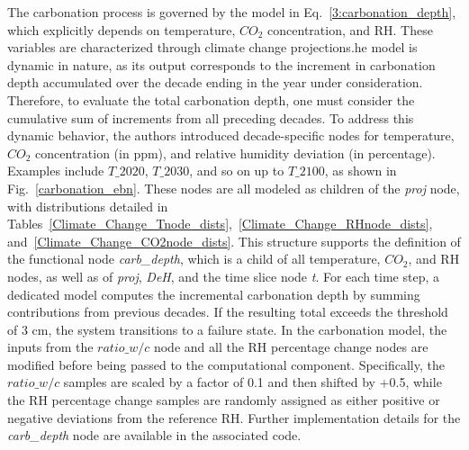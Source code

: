 The carbonation process is governed by the model in Eq.~\ref{3:carbonation_depth}, which explicitly depends on temperature, $CO_2$ concentration, and RH. These variables are characterized through climate change projections.he model is dynamic in nature, as its output corresponds to the increment in carbonation depth accumulated over the decade ending in the year under consideration. Therefore, to evaluate the total carbonation depth, one must consider the cumulative sum of increments from all preceding decades.
To address this dynamic behavior, the authors introduced decade-specific nodes for temperature, $CO_2$ concentration (in ppm), and relative humidity deviation (in percentage). Examples include $T\_ {2020}$, $T\_ {2030}$, and so on up to $T\_ {2100}$, as shown in Fig.~\ref{carbonation_ebn}. These nodes are all modeled as children of the \textit{proj} node, with distributions detailed in Tables~\ref{Climate_Change_Tnode_dists},~\ref{Climate_Change_RHnode_dists}, and~\ref{Climate_Change_CO2node_dists}.
This structure supports the definition of the functional node \textit{carb\_depth}, which is a child of all temperature, $CO_2$, and RH nodes, as well as of \textit{proj}, \textit{DeH}, and the time slice node \textit{t}. For each time step, a dedicated model computes the incremental carbonation depth by summing contributions from previous decades. If the resulting total exceeds the threshold of 3 cm, the system transitions to a failure state. 
In the carbonation model, the inputs from the $ratio\_w/c$ node and all the RH percentage change nodes are modified before being passed to the computational component. Specifically, the $ratio\_w/c$ samples are scaled by a factor of 0.1 and then shifted by +0.5, while the RH percentage change samples are randomly assigned as either positive or negative deviations from the reference RH.
Further implementation details for the \textit{carb\_depth} node are available in the associated code.
